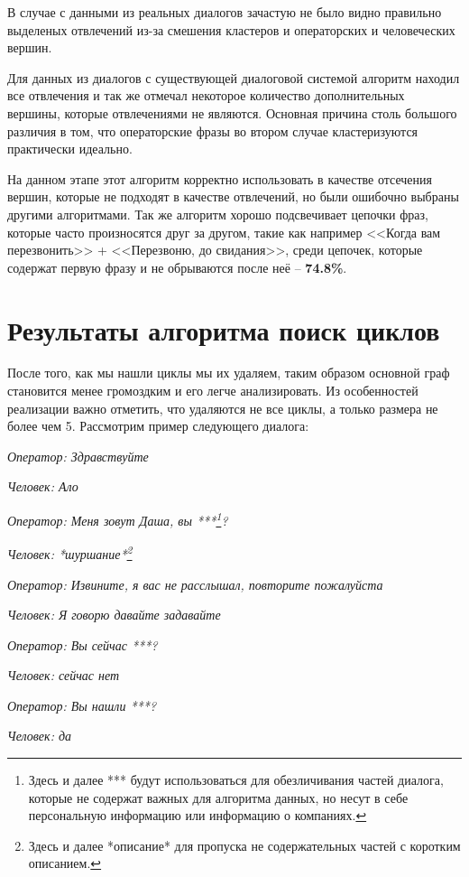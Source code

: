 \documentclass[times,specification,annotation]{itmo-student-thesis}
\begin{document}
	В случае с данными из реальных диалогов зачастую не было видно правильно выделеных отвлечений из-за смешения кластеров и операторских и человеческих вершин.
		
	Для данных из диалогов с существующей диалоговой системой алгоритм находил все отвлечения и так же отмечал некоторое количество дополнительных вершины, которые отвлечениями не являются. Основная причина столь большого различия в том, что операторские фразы во втором случае кластеризуются практически идеально. 
	
	На данном этапе этот алгоритм корректно использовать в качестве отсечения вершин, которые не подходят в качестве отвлечений, но были ошибочно выбраны другими алгоритмами. Так же алгоритм хорошо подсвечивает цепочки фраз, которые часто произносятся друг за другом, такие как например <<Когда вам перезвонить>> + <<Перезвоню, до свидания>>, среди цепочек, которые содержат первую фразу и не обрываются после неё -- \textbf{74.8\%}.
	
	\section{Результаты алгоритма поиск циклов}
	После того, как мы нашли циклы мы их удаляем, таким образом основной граф становится менее громоздким и его легче анализировать. Из особенностей реализации важно отметить, что удаляются не все циклы, а только размера не более чем 5. Рассмотрим пример следующего диалога:
	
	\textit{Оператор: Здравствуйте}
	
	\textit{Человек:  Ало}
	
	\textit{Оператор:  Меня зовут Даша, вы ***\footnote{Здесь и далее *** будут использоваться для обезличивания частей диалога, которые не содержат важных для алгоритма данных, но несут в себе персональную информацию или информацию о компаниях.}?}
	
	\textit{Человек:  *шуршание*\footnote{Здесь и далее *описание* для пропуска не содержательных частей с коротким описанием.}}
	
	\textit{Оператор:  Извините, я вас не расслышал, повторите пожалуйста}
	
	\textit{Человек:  Я говорю давайте задавайте}
	
	\textit{Оператор:  Вы сейчас ***?}
	
	\textit{Человек:  сейчас нет}
	
	\textit{Оператор:  Вы нашли ***?}
	
	\textit{Человек:  да}
	
\end{document}
